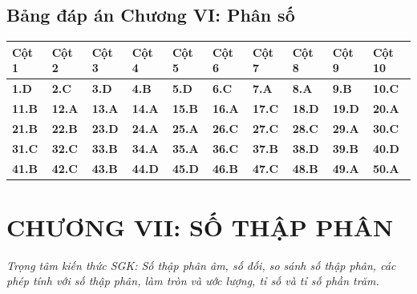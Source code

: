 \documentclass[11pt,a4paper]{article}
\begin{document}
\subsection*{\color{primary} Bảng đáp án Chương VI: Phân số}
\begin{center}
\renewcommand{\arraystretch}{1.25}
\begin{tabularx}{\textwidth}{*{10}{>{\centering\arraybackslash}X}}
\toprule
\textbf{\color{primary} Cột 1} & \textbf{\color{primary} Cột 2} & \textbf{\color{primary} Cột 3} & \textbf{\color{primary} Cột 4} & \textbf{\color{primary} Cột 5} & \textbf{\color{primary} Cột 6} & \textbf{\color{primary} Cột 7} & \textbf{\color{primary} Cột 8} & \textbf{\color{primary} Cột 9} & \textbf{\color{primary} Cột 10} \\
\midrule
\textbf{1.D} & \textbf{2.C} & \textbf{3.D} & \textbf{4.B} & \textbf{5.D} & \textbf{6.C} & \textbf{7.A} & \textbf{8.A} & \textbf{9.B} & \textbf{10.C} \\
\rowcolor{rowtint} \textbf{11.B} & \textbf{12.A} & \textbf{13.A} & \textbf{14.A} & \textbf{15.B} & \textbf{16.A} & \textbf{17.C} & \textbf{18.D} & \textbf{19.D} & \textbf{20.A} \\
\textbf{21.B} & \textbf{22.B} & \textbf{23.D} & \textbf{24.A} & \textbf{25.A} & \textbf{26.C} & \textbf{27.C} & \textbf{28.C} & \textbf{29.A} & \textbf{30.C} \\
\rowcolor{rowtint} \textbf{31.C} & \textbf{32.C} & \textbf{33.B} & \textbf{34.A} & \textbf{35.A} & \textbf{36.C} & \textbf{37.B} & \textbf{38.D} & \textbf{39.B} & \textbf{40.D} \\
\textbf{41.B} & \textbf{42.C} & \textbf{43.B} & \textbf{44.D} & \textbf{45.D} & \textbf{46.B} & \textbf{47.C} & \textbf{48.B} & \textbf{49.A} & \textbf{50.A} \\
\bottomrule
\end{tabularx}
\end{center}\vspace{10pt}
\section*{\color{primary} CHƯƠNG VII: SỐ THẬP PHÂN}
\textit{Trọng tâm kiến thức SGK: Số thập phân âm, số đối, so sánh số thập phân, các phép tính với số thập phân, làm tròn và ước lượng, tỉ số và tỉ số phần trăm.}\par\vspace{4pt}
\end{document}
